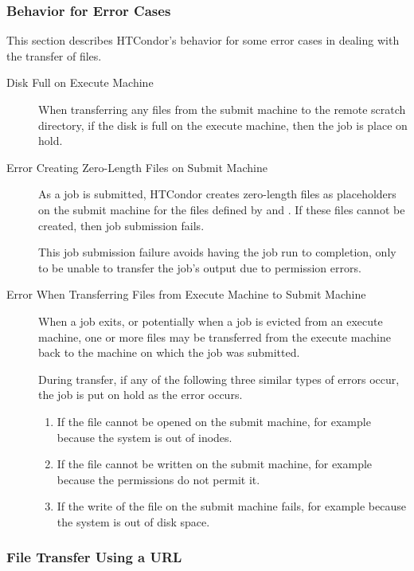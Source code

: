 \subsubsection{Behavior for Error Cases}
This section describes HTCondor's behavior for some error cases
in dealing with the transfer of files.
\begin{description}
\item[Disk Full on Execute Machine]
  When transferring any files from the submit machine to the remote scratch
  directory,
  if the disk is full on the execute machine,
  then the job is place on hold.
\item[Error Creating Zero-Length Files on Submit Machine]
  As a job is submitted, HTCondor creates zero-length files as placeholders
  on the submit machine for the files defined by 
   and .
  If these files cannot be created, then job submission fails.

  This job submission failure avoids having the job run to completion,
  only to be unable to transfer the job's output due to permission errors.
\item[Error When Transferring Files from Execute Machine to Submit Machine]
  When a job exits, or potentially when a job is evicted from an execute
  machine, one or more files may be transferred from the execute machine
  back to the machine on which the job was submitted.

  During transfer, if any of the following three similar types of errors occur,
  the job is put on hold as the error occurs.
  \begin{enumerate}
  \item If the file cannot be opened on the submit machine, for example
    because the system is out of inodes.
  \item If the file cannot be written on the submit machine, for example
    because the permissions do not permit it.
  \item If the write of the file on the submit machine fails, for example
    because the system is out of disk space.
  \end{enumerate}
\end{description}

\subsubsection{File Transfer Using a URL \label{sec:file-transfer-by-URL}}

